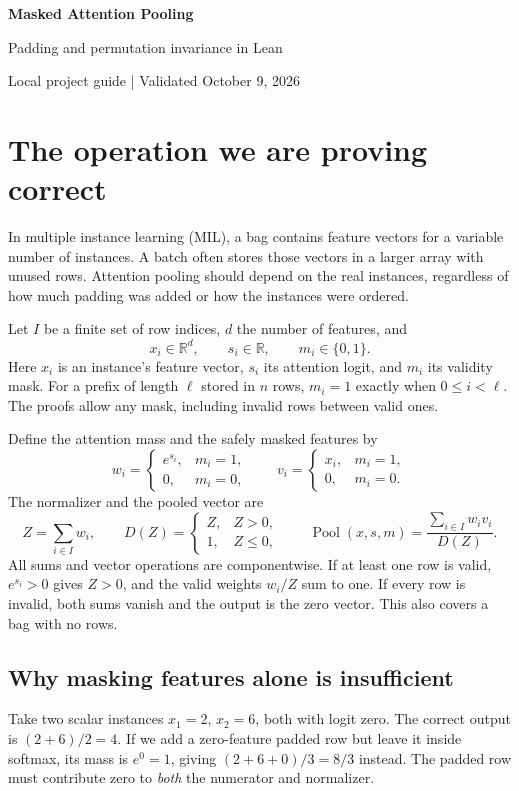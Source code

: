 \documentclass[11pt]{article}
\newcommand{\Pool}{\operatorname{Pool}}
\newcommand{\result}[1]{\boxed{#1}}
\begin{document}
{\LARGE\bfseries\color{accent}Masked Attention Pooling}\par
{\large Padding and permutation invariance in Lean}\par
{\small Local project guide \quad | \quad Validated October 9, 2026}
\vspace{6pt}

\section{The operation we are proving correct}
In multiple instance learning (MIL), a bag contains feature vectors for a
variable number of instances. A batch often stores those vectors in a larger
array with unused rows. Attention pooling should depend on the real instances,
regardless of how much padding was added or how the instances were ordered.

Let $I$ be a finite set of row indices, $d$ the number of features, and
\[
 x_i\in\mathbb R^d,\qquad s_i\in\mathbb R,\qquad m_i\in\{0,1\}.
\]
Here $x_i$ is an instance's feature vector, $s_i$ its attention logit, and $m_i$
its validity mask. For a prefix of length $\ell$ stored in $n$ rows,
$m_i=1$ exactly when $0\leq i<\ell$. The proofs allow any mask, including
invalid rows between valid ones.

Define the attention mass and the safely masked features by
\[
 w_i=\begin{cases}e^{s_i},&m_i=1,\\0,&m_i=0,\end{cases}
 \qquad
 v_i=\begin{cases}x_i,&m_i=1,\\0,&m_i=0.\end{cases}
\]
The normalizer and the pooled vector are
\begin{equation}\label{eq:pool}
 Z=\sum_{i\in I}w_i,\qquad
 D(Z)=\begin{cases}Z,&Z>0,\\1,&Z\leq0,\end{cases}
 \qquad
 \result{\Pool(x,s,m)=\frac{\sum_{i\in I}w_i v_i}{D(Z)}}.
\end{equation}
All sums and vector operations are componentwise. If at least one row is valid,
$e^{s_i}>0$ gives $Z>0$, and the valid weights $w_i/Z$ sum to one. If every row
is invalid, both sums vanish and the output is the zero vector. This also
covers a bag with no rows.

\subsection*{Why masking features alone is insufficient}
Take two scalar instances $x_1=2$, $x_2=6$, both with logit zero. The correct
output is $(2+6)/2=4$. If we add a zero-feature padded row but leave it inside
softmax, its mass is $e^0=1$, giving $(2+6+0)/3=8/3$ instead.
The padded row must contribute zero to \emph{both} the numerator and normalizer.
\end{document}
